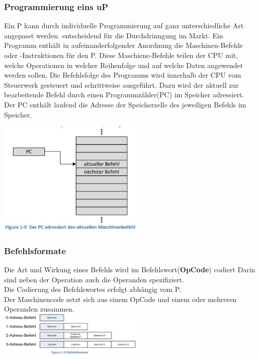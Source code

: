 \subsubsection{Programmierung eins uP}
\begin{minipage}{10cm}
    Ein \mu P kann durch individuelle Programmierung auf ganz unterschiedliche Art angepasst werden. \newline
    \rightarrow entscheidend für die Durchdrinngung im Markt.\newline
    Ein Programm enthält in aufeinanderfolgender Anordnung die Maschinen-Befehle oder -Instruktionen für den \mu P. Diese Maschiene-Befehle teilen der CPU mit, welche Operationen in welcher Reihenfolge und auf welche Daten angewendet werden sollen, \newline
    Die Befehlsfolge des Programms wird innerhalb der CPU vom Steuerwerk gesteuert und schrittweise ausgeführt. Dazu wird der aktuell zur bearbeitende Befehl durch einen Programmzähler(PC) im Speicher adressiert.\newline
    Der PC enthält laufend die Adresse der Speicherzelle des jeweiligen Befehls im Speicher.
\end{minipage}
\includegraphics[width=7cm]{images/uPPC}
    
\subsubsection{Befehlsformate}
Die Art und Wirkung eines Befehls wird im Befehlswort(\textbf{OpCode}) codiert \newline
Darin sind neben der Operation auch die Operanden spezifiziert.\\
Die Codierung des Befehlswortes erfolgt abhängig vom \mu P.\\
Der Maschinencode setzt sich aus einem OpCode und einem oder mehreren Operanden zusammen.\\
\includegraphics[width=7cm]{images/Befehlsformate}


